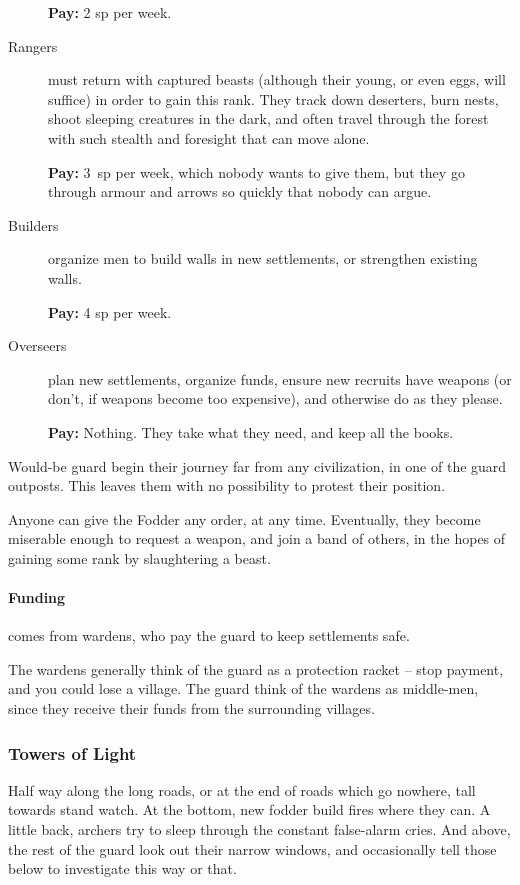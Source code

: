 \begin{multicols}{2}
\begin{description}
  \textbf{Pay:} 2 \gls{sp} per week.

  \item[Rangers]
  must return with captured beasts (although their young, or even eggs, will suffice) in order to gain this rank.
  They track down deserters, burn nests, shoot sleeping creatures in the dark, and often travel through the forest with such stealth and foresight that can move alone.
  
  \textbf{Pay:} 3~\gls{sp} per week, which nobody wants to give them, but they go through armour and arrows so quickly that nobody can argue.

  \item[Builders]
  organize men to build walls in new settlements, or strengthen existing walls.

  \textbf{Pay:} 4 \gls{sp} per week.

  \item[Overseers]
  plan new settlements, organize funds, ensure new recruits have weapons (or don't, if weapons become too expensive), and otherwise do as they please.

  \textbf{Pay:} Nothing.
  They take what they need, and keep all the books.

\end{description}

\noindent
Would-be \gls{guard} begin their journey far from any civilization, in one of the \gls{guard} outposts.
This leaves them with no possibility to protest their position.

Anyone can give the Fodder any order, at any time.
Eventually, they become miserable enough to request a weapon, and join a band of others, in the hopes of gaining some rank by slaughtering a beast.

\paragraph{Funding}
comes from wardens, who pay the guard to keep settlements safe.

The wardens generally think of the \gls{guard} as a protection racket -- stop payment, and you could lose a village.
The \gls{guard} think of the wardens as middle-men, since they receive their funds from the surrounding villages.

\subsubsection{Towers of Light}
Half way along the long roads, or at the end of roads which go nowhere, tall towards stand watch.
At the bottom, new fodder build fires where they can.
A little back, archers try to sleep through the constant false-alarm cries.
And above, the rest of the guard look out their narrow windows, and occasionally tell those below to investigate this way or that.


\end{multicols}
